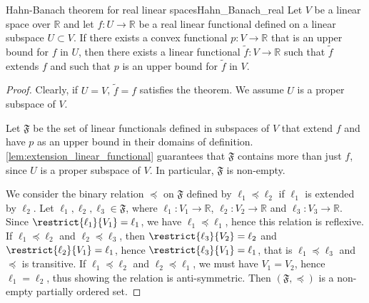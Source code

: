 \begin{theorem}{Hahn-Banach theorem for real linear spaces}{Hahn_Banach_real}
    Let \(V\) be a linear space over \(\mathbb{R}\) and let \(f : U \to \mathbb{R}\) be a real linear functional defined on a linear subspace \(U\subset V\). If there exists a convex functional \(p : V \to \mathbb{R}\) that is an upper bound for \(f\) in \(U\), then there exists a linear functional \(\tilde{f} : V \to \mathbb{R}\) such that \(\tilde{f}\) extends \(f\) and such that \(p\) is an upper bound for \(\tilde{f}\) in \(V\).
\end{theorem}
\begin{proof}
    Clearly, if \(U = V\), \(\tilde{f} = f\) satisfies the theorem. We assume \(U\) is a proper subspace of \(V\).

    Let \(\mathfrak{F}\) be the set of linear functionals defined in subspaces of \(V\) that extend \(f\) and have \(p\) as an upper bound in their domains of definition. \cref{lem:extension_linear_functional} guarantees that \(\mathfrak{F}\) contains more than just \(f\), since \(U\) is a proper subspace of \(V\). In particular, \(\mathfrak{F}\) is non-empty.

    We consider the binary relation \(\preceq\) on \(\mathfrak{F}\) defined by \(\ell_1 \preceq \ell_2\) if \(\ell_1\) is extended by \(\ell_2\). Let \(\ell_1, \ell_2, \ell_3 \in \mathfrak{F}\), where \(\ell_1 : V_1 \to \mathbb{R}\), \(\ell_2 : V_2 \to \mathbb{R}\) and \(\ell_3 : V_3 \to \mathbb{R}\). Since \(\restrict{\ell_1}{V_1} = \ell_1\), we have \(\ell_1 \preceq \ell_1\), hence this relation is reflexive. If \(\ell_1 \preceq \ell_2\) and \(\ell_2 \preceq \ell_3\), then \(\restrict{\ell_3}{V_2} = \ell_2\) and \(\restrict{\ell_2}{V_1} = \ell_1\), hence \(\restrict{\ell_3}{V_1} = \ell_1\), that is \(\ell_1 \preceq \ell_3\) and \(\preceq\) is transitive. If \(\ell_1 \preceq \ell_2\) and \(\ell_2 \preceq \ell_1\), we must have \(V_1 = V_2\), hence \(\ell_1 = \ell_2\), thus showing the relation is anti-symmetric. Then \((\mathfrak{F}, \preceq)\) is a non-empty partially ordered set.


\end{proof}
